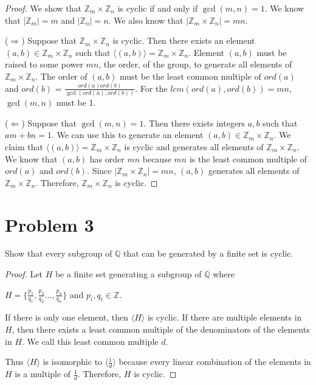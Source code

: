 \documentclass{article}
\theoremstyle{plain} %
\theoremstyle{definition} %
\begin{document}
\begin{proof}
    We show that $\mathbb{Z}_m \times \mathbb{Z}_n$ is cyclic if and only if $\gcd(m,n) = 1$. 
    We know that $|\mathbb{Z}_m| = m$ and $|\mathbb{Z}_n| = n$.
    We also know that $|\mathbb{Z}_m \times \mathbb{Z}_n| = mn$.

    ($\Rightarrow$)
    Suppose that $\mathbb{Z}_m \times \mathbb{Z}_n$ is cyclic. Then there exists an element $(a,b) \in \mathbb{Z}_m \times \mathbb{Z}_n$
    such that $\langle (a,b) \rangle = \mathbb{Z}_m \times \mathbb{Z}_n$. Element $(a,b)$ must be raised to some power $mn$, the order,
    of the group, to generate all elements of $\mathbb{Z}_m \times \mathbb{Z}_n$. The order of $(a,b)$ must be the least common multiple of $ord(a)$ and $ord(b)$ = $\frac{ord(a)ord(b)}{\gcd(ord(a),ord(b))}$.
    For the $lcm(ord(a),ord(b)) = mn$, $\gcd(m,n)$ must be 1.

    ($\Leftarrow$)
    Suppose that $\gcd(m,n) = 1$. Then there exists integers $a,b$ such that $am + bn = 1$.
    We can use this to generate an element $(a,b) \in \mathbb{Z}_m \times \mathbb{Z}_n$.
    We claim that $\langle (a,b) \rangle = \mathbb{Z}_m \times \mathbb{Z}_n$ is cyclic and generates all elements of $\mathbb{Z}_m \times \mathbb{Z}_n$.
    We know that $(a,b)$ has order $mn$ because $mn$ is the least common multiple of $ord(a)$ and $ord(b)$.
    Since $|\mathbb{Z}_m \times \mathbb{Z}_n| = mn$, $(a,b)$ generates all elements of $\mathbb{Z}_m \times \mathbb{Z}_n$.
    Therefore, $\mathbb{Z}_m \times \mathbb{Z}_n$ is cyclic.

\end{proof}

\section*{Problem 3}
\noindent{} Show that every subgroup of $\mathbb{Q}$ that can be generated
by a finite set is cyclic.

\begin{proof}

    Let $H$ be a finite set generating a subgroup of $\mathbb{Q}$ where

    $H = \{ \frac{p_1}{q_1}, \frac{p_2}{q_2} \ldots, \frac{p_n}{q_n} \}$ and $p_i,q_i \in \mathbb{Z}$.

    If there is only one element, then $\langle H \rangle$ is cyclic.
    If there are multiple elements in $H$, then there exists a least common multiple of the denominators of the elements in $H$.
    We call this least common multiple $d$.

Thus $\langle H \rangle$ is isomorphic to $\langle \frac{1}{d} \rangle$ because
every linear combination of the elements in $H$ is a multiple of $\frac{1}{d}$.
Therefore, $H$ is cyclic.
\end{proof}
\end{document}
